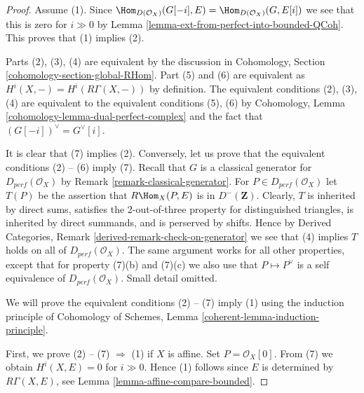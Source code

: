 \begin{proof}
Assume (1). Since
$\Hom_{D(\mathcal{O}_X)}(G[-i], E) = \Hom_{D(\mathcal{O}_X)}(G, E[i])$
we see that this is zero for $i \gg 0$ by
Lemma \ref{lemma-ext-from-perfect-into-bounded-QCoh}. This proves
that (1) implies (2).

\medskip\noindent
Parts (2), (3), (4) are equivalent by the discussion in
Cohomology, Section \ref{cohomology-section-global-RHom}.
Part (5) and (6) are equivalent as $H^i(X, -) = H^i(R\Gamma(X, -))$
by definition. The equivalent conditions (2), (3), (4) are
equivalent to the equivalent conditions (5), (6) by
Cohomology, Lemma \ref{cohomology-lemma-dual-perfect-complex}
and the fact that $(G[-i])^\vee = G^\vee[i]$.

\medskip\noindent
It is clear that (7) implies (2). Conversely, 
let us prove that the equivalent conditions (2) -- (6) imply (7).
Recall that $G$ is a  classical generator for $D_{perf}(\mathcal{O}_X)$ by
Remark \ref{remark-classical-generator}.
For $P \in D_{perf}(\mathcal{O}_X)$ let $T(P)$ be the assertion that
$R\Hom_X(P, E)$ is in $D^-(\mathbf{Z})$.
Clearly, $T$ is inherited by direct sums,
satisfies the 2-out-of-three property for distinguished
triangles, is inherited by direct summands, and is perserved by shifts.
Hence by Derived Categories, Remark \ref{derived-remark-check-on-generator}
we see that (4) implies $T$ holds on all of $D_{perf}(\mathcal{O}_X)$.
The same argument works for all other properties, except that for property
(7)(b) and (7)(c) we also use that $P \mapsto P^\vee$ is a self
equivalence of $D_{perf}(\mathcal{O}_X)$. Small detail omitted.

\medskip\noindent
We will prove the equivalent conditions (2) -- (7) imply (1)
using the induction principle of
Cohomology of Schemes, Lemma \ref{coherent-lemma-induction-principle}.

\medskip\noindent
First, we prove (2) -- (7) $\Rightarrow$ (1) if $X$ is affine.
Set $P = \mathcal{O}_X[0]$. From (7) we obtain $H^i (X, E) = 0$ for $i \gg 0$.
Hence (1) follows since $E$ is determined by $R\Gamma (X, E)$,
see Lemma \ref{lemma-affine-compare-bounded}.


\end{proof}
